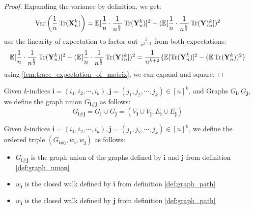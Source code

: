 \begin{proof}
    \notready
    Expanding the variance by definition, we get:
    $$
    \operatorname{Var}\left(\frac{1}{n}\operatorname{Tr}(\mathbf{X}_{n}^{k})\right) = \mathbb{E}[\frac{1}{n} \cdot \frac{1}{n^{\frac{k}{2}}} \operatorname{Tr}(\mathbf{Y}_{n}^{k})]^2 - (\mathbb{E}[\frac{1}{n}\cdot \frac{1}{n^{\frac{k}{2}}} \operatorname{Tr}(\mathbf{Y})_{n}^{k}])^2
    $$ 
    use the linearity of expectation to factor out $\frac{1}{n^{k+2}}$ from both expectations:
    $$
    \mathbb{E}[\frac{1}{n} \cdot \frac{1}{n^{\frac{k}{2}}} \operatorname{Tr}(\mathbf{Y}_{n}^{k})]^2 - (\mathbb{E}[\frac{1}{n}\cdot \frac{1}{n^{\frac{k}{2}}} \operatorname{Tr}(\mathbf{Y})_{n}^{k}])^2 = \frac{1}{n^{k+2}} \{\mathbb{E}[\operatorname{Tr}(\mathbf{Y}_{n}^{k})]^2 - (\mathbb{E} \operatorname{Tr}(\mathbf{Y}_{n}^{k}))^2\}
    $$ 
    using \ref{lem:trace_expectation_of_matrix}, we can expand and square:
\end{proof}


\begin{definition}
    \label{def:graph_union}
    \notready
    Given $k$-indices $\mathbf{i} = (i_1, i_2, \cdots , i_{k}), \mathbf{j} = (j_1, j_2, \cdots , j_{k}) \in [n]^{k}$, and Graphs $G_{\mathbf{i}}, G_{\mathbf{j}}$, we define the graph union $G_{\mathbf{i} \# \mathbf{j}}$ as follows:
    $$
    G_{\mathbf{i} \# \mathbf{j}}  = G_{\mathbf{i}} \cup G_{\mathbf{j}} = (V_{\mathbf{i}} \cup V_{\mathbf{j}}, E_{\mathbf{i}} \cup E_{\mathbf{j}})
    $$
\end{definition}


\begin{definition}
    \label{def:ordered_triple}
    \notready
    Given $k$-indices $\mathbf{i} = (i_1, i_2, \cdots , i_{k}), \mathbf{j} = (j_1, j_2, \cdots , j_{k}) \in [n]^{k}$, we define the ordered triple $(G_{\mathbf{i} \# \mathbf{j}}, w_{\mathbf{i}}, w_{\mathbf{j}})$ as follows:
    \begin{itemize}
        \item $G_{\mathbf{i} \# \mathbf{j}}$ is the graph union of the graphs defined by $\mathbf{i}$ and $\mathbf{j}$ from definition \ref{def:graph_union}
        \item $w_{\mathbf{i}}$ is the closed walk defined by $\mathbf{i}$ from definition \ref{def:graph_path}
        \item $w_{\mathbf{i}}$ is the closed walk defined by $\mathbf{j}$ from definition \ref{def:graph_path}
    \end{itemize}
\end{definition}

